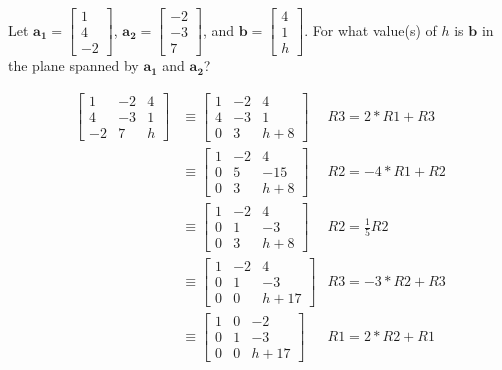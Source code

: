 \documentclass{mathhomework}
\newcommand{\Vect}[1]{\pmb{#1}}
\begin{document}
\begin{problem}[1.3\#17]
    Let $\Vect{a_1} = \begin{bmatrix}1 \\ 4 \\ -2\end{bmatrix}$, 
    $\Vect{a_2} = \begin{bmatrix}-2 \\ -3 \\ 7\end{bmatrix}$, and
    $\Vect{b} = \begin{bmatrix}4 \\ 1 \\ h\end{bmatrix}$. For what value(s) of $h$ is $\Vect{b}$ in the plane spanned by $\Vect{a_1}$ and $\Vect{a_2}$?

    \begin{solution}
        \begin{align*}
            \begin{bmatrix}
                1 & -2 & 4 \\
                4 & -3 & 1 \\
                -2 & 7 & h
            \end{bmatrix}
            & \equiv
            \begin{bmatrix}
                1 & -2 & 4 \\
                4 & -3 & 1 \\
                0 & 3 & h + 8
            \end{bmatrix}
            & R3 = 2 * R1 + R3 \\ & \equiv
            \begin{bmatrix}
                1 & -2 & 4 \\
                0 & 5 & -15 \\
                0 & 3 & h + 8
            \end{bmatrix}
            & R2 = -4 * R1 + R2 \\ & \equiv
            \begin{bmatrix}
                1 & -2 & 4 \\
                0 & 1 & -3 \\
                0 & 3 & h + 8
            \end{bmatrix}
            & R2 = \frac{1}{5} R2 \\ & \equiv
            \begin{bmatrix}
                1 & -2 & 4 \\
                0 & 1 & -3 \\
                0 & 0 & h + 17
            \end{bmatrix}
            & R3 = -3 * R2 + R3 \\ & \equiv
            \begin{bmatrix}
                1 & 0 & -2 \\
                0 & 1 & -3 \\
                0 & 0 & h + 17
            \end{bmatrix}
            & R1 = 2 * R2 + R1
        \end{align*}


\end{solution}
\end{problem}
\end{document}
